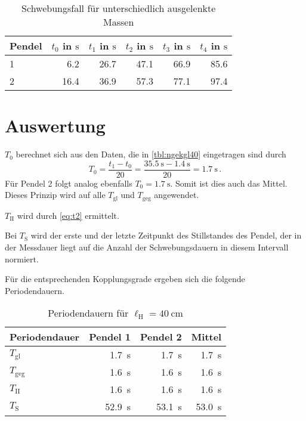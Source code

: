 \documentclass[12pt,a4paper]{scrartcl}
\newcommand{\lh}{\ell_{\mathrm{H}}}
\begin{document}
\begin{table}[H]
		\caption{Schwebungsfall für unterschiedlich ausgelenkte Massen \label{tbl:schwebX70}}
	\begin{tabular*}{\textwidth}{@{\extracolsep{\fill}}@{\hspace{5pt}}lrrrrr@{\hspace{5pt}}}
		\toprule
		Pendel & \(t_0\) in \(\si{\second}\) & \(t_1\) in \(\si{\second}\)& \(t_2\) in \(\si{\second}\)& \(t_3\) in \(\si{\second}\)& \(t_4\) in \(\si{\second}\)\\
		\midrule
		1 & \num{6,2}   & \num{26,7} & \num{47,1} & \num{66,9} & \num{85,6}\\
		2 & \num{16,4}   & \num{36,9} & \num{57,3} & \num{77,1} & \num{97,4}\\
		\bottomrule
	\end{tabular*}
\end{table}

\section{Auswertung}

\(T_0\) berechnet sich aus den Daten, die in \autoref{tbl:ngekgl40} eingetragen sind durch
\begin{equation*}
	T_0 = \frac{t_1 - t_0}{20} = \frac{\qty{35,5}{\second} - \qty{1,4}{\second}}{20} = \qty{1,7}{\second} \,.
\end{equation*}
Für Pendel \num{2} folgt analog ebenfalls \(T_0 =\qty{1,7}{\second}\). Somit ist dies auch das Mittel. Dieses Prinzip wird auf alle \(T_{\text{gl}}\) und \(T_{\text{geg}}\) angewendet.

\(T_{\text{II}}\) wird durch \autoref{eq:t2} ermittelt. %

Bei \(T_{\text{S}}\) wird der erste und der letzte Zeitpunkt des Stillstandes des Pendel, der in der Messdauer liegt auf die Anzahl der Schwebungsdauern in diesem Intervall normiert. %

Für die entsprechenden Kopplungsgrade ergeben sich die folgende Periodendauern.

\begin{table}[H]
		\caption{Periodendauern für \(\lh = \qty{40}{\centi\meter}\) \label{tbl:res40}}
	\begin{tabular*}{\textwidth}{@{\extracolsep{\fill}}@{\hspace{5pt}}lrrr@{\hspace{5pt}}}
		\toprule
		Periodendauer & Pendel 1 & Pendel 2 & Mittel\\
		\midrule
		\(T_{\text{gl}}\) & \qty{1,7}{\second} & \qty{1,7}{\second} & \qty{1,7}{\second}\\
		\(T_{\text{geg}}\) & \qty{1,6}{\second} & \qty{1,6}{\second} & \qty{1,6}{\second}\\
		\(T_{\text{II}}\) & \qty{1,6}{\second} & \qty{1,6}{\second} & \qty{1,6}{\second}\\
		\(T_{\text{S}}\) & \qty{52,9}{\second} & \qty{53,1}{\second} & \qty{53,0}{\second} \\
		\bottomrule
	\end{tabular*}
\end{table}
\end{document}
